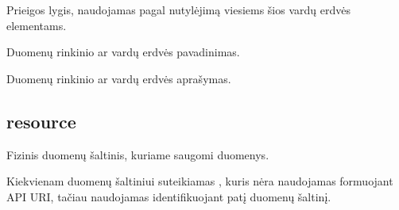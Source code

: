 \documentclass[letterpaper,10pt,lithuanian]{sphinxmanual}
\begin{document}

\begin{fulllineitems}
\label{\detokenize{dimensijos:dataset.access}}
\pysigstartsignatures
{}
\pysigstopsignatures
\sphinxAtStartPar
Prieigos lygis, naudojamas pagal nutylėjimą viesiems šios vardų erdvės
elementams.

\end{fulllineitems}


\begin{fulllineitems}
\label{\detokenize{dimensijos:dataset.title}}
\pysigstartsignatures
{}
\pysigstopsignatures
\sphinxAtStartPar
Duomenų rinkinio ar vardų erdvės pavadinimas.

\end{fulllineitems}


\begin{fulllineitems}
\label{\detokenize{dimensijos:dataset.description}}
\pysigstartsignatures
{}
\pysigstopsignatures
\sphinxAtStartPar
Duomenų rinkinio ar vardų erdvės aprašymas.

\end{fulllineitems}



\subsection{resource}
\label{\detokenize{dimensijos:resource}}\label{\detokenize{dimensijos:id3}}\label{\detokenize{dimensijos:module-resource}}
\sphinxAtStartPar
Fizinis duomenų šaltinis, kuriame saugomi duomenys.

\sphinxAtStartPar
Kiekvienam duomenų šaltiniui suteikiamas , kuris nėra naudojamas formuojant API URI, tačiau naudojamas
identifikuojant patį duomenų šaltinį.
\end{document}

